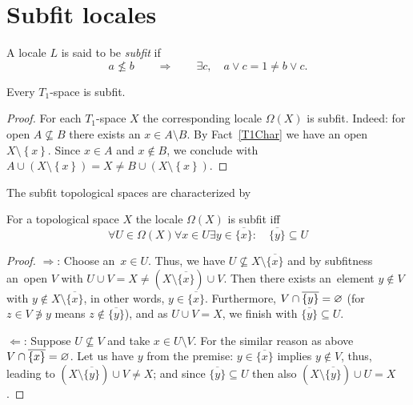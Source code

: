 \section{Subfit locales}

\begin{framed}
  \begin{df}[Sfit]
    A locale $L$ is said to be \emph{subfit\/} if
    \[
      a \not\le b \qquad \Rightarrow \qquad \exists c, \quad a \vee c = 1 \ne b
      \vee c.
    \]
  \end{df}
\end{framed}

\begin{thm} \label{T1->Sfit}
  Every $T_1$-space is subfit.
\end{thm}

\begin{proof}
  For each $T_1$-space $X$ the corresponding locale $\Omega(X)$ is subfit.
  Indeed: for open $A\not\subseteq B$ there exists an $x\in A \setminus B$.
  By Fact~\ref{T1Char} we have an open $X\setminus \left\{x\right\}$.
  Since $x\in A$ and $x\not\in B$, we conclude with $A\cup (X\setminus
  \left\{x\right\}) = X \ne B \cup (X\setminus \left\{x\right\})$.
\end{proof}

The subfit topological spaces are characterized by

\begin{prop} \label{Sfit-char}
  For a topological space $X$ the locale $\Omega(X)$ is subfit iff
  \[
    \forall U\in\Omega(X) \forall x\in U \exists y\in \overline{\{x\}}: \quad
    \overline{\{y\}} \subseteq U
  \]
\end{prop}
\begin{proof}
  $\Rightarrow$:
  Choose an~$x \in U$.
  Thus, we have $U\not\subseteq X\setminus \overline{\{x\}}$ and by subfitness
  an~open $V$ with $U \cup V = X \ne (X\setminus \overline{\{x\}}) \cup V$.
  Then there exists an~element $y\not\in V$ with $y\not\in X\setminus
  \overline{\{x\}}$, in other words, $y\in \overline{\{x\}}$.
  Furthermore, $V \cap \overline{\{y\}} = \varnothing$ (for $z \in V \not\owns y$
  means $z\not\in \overline{\{y\}}$), and as $U \cup V = X$, we finish with
  $\overline{\{y\}} \subseteq U$.

  $\Leftarrow$:
  Suppose $U\not\subseteq V$ and take $x\in U\setminus V$.
  For the similar reason as above $V \cap \overline{\{x\}} = \varnothing$.
  Let us have $y$ from the premise:
  $y \in \overline{\{x\}}$ implies  $y\not\in V$, thus, leading to $(X\setminus
  \overline{\{y\}}) \cup V \ne X$;
  and since $\overline{\{y\}} \subseteq U$ then also $(X\setminus
  \overline{\{y\}}) \cup U = X$.
\end{proof}

